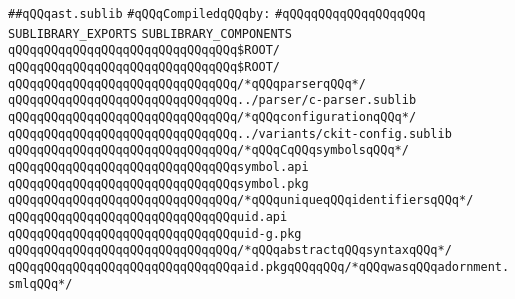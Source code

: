 \label{src/lib/c-kit/src/ast/ast.sublib}
\verb|##qQQqast.sublib|\newline
\newline
\verb|#qQQqCompiledqQQqby:|\newline
\verb|#qQQqqQQqqQQqqQQqqQQq|\newline
\newline
\verb|SUBLIBRARY_EXPORTS|\newline
\newline
\newline
\verb|SUBLIBRARY_COMPONENTS|\newline
\newline
\verb|qQQqqQQqqQQqqQQqqQQqqQQqqQQqqQQq$ROOT/|\newline
\verb|qQQqqQQqqQQqqQQqqQQqqQQqqQQqqQQq$ROOT/|\newline
\newline
\newline
\verb|qQQqqQQqqQQqqQQqqQQqqQQqqQQqqQQq/*qQQqparserqQQq*/|\newline
\verb|qQQqqQQqqQQqqQQqqQQqqQQqqQQqqQQq../parser/c-parser.sublib|\newline
\newline
\verb|qQQqqQQqqQQqqQQqqQQqqQQqqQQqqQQq/*qQQqconfigurationqQQq*/|\newline
\verb|qQQqqQQqqQQqqQQqqQQqqQQqqQQqqQQq../variants/ckit-config.sublib|\newline
\newline
\verb|qQQqqQQqqQQqqQQqqQQqqQQqqQQqqQQq/*qQQqCqQQqsymbolsqQQq*/|\newline
\verb|qQQqqQQqqQQqqQQqqQQqqQQqqQQqqQQqsymbol.api|\newline
\verb|qQQqqQQqqQQqqQQqqQQqqQQqqQQqqQQqsymbol.pkg|\newline
\newline
\verb|qQQqqQQqqQQqqQQqqQQqqQQqqQQqqQQq/*qQQquniqueqQQqidentifiersqQQq*/|\newline
\verb|qQQqqQQqqQQqqQQqqQQqqQQqqQQqqQQquid.api|\newline
\verb|qQQqqQQqqQQqqQQqqQQqqQQqqQQqqQQquid-g.pkg|\newline
\newline
\verb|qQQqqQQqqQQqqQQqqQQqqQQqqQQqqQQq/*qQQqabstractqQQqsyntaxqQQq*/|\newline
\verb|qQQqqQQqqQQqqQQqqQQqqQQqqQQqqQQqaid.pkgqQQqqQQq/*qQQqwasqQQqadornment.smlqQQq*/|\newline
